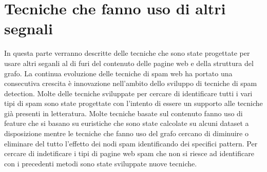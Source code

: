\section{Tecniche che fanno uso di altri segnali}
In questa parte verranno descritte delle tecniche che sono state progettate per usare altri seganli al di furi del contenuto delle pagine web e della struttura del grafo. La continua evoluzione delle tecniche di spam web ha portato una consecutiva crescita è innovazione nell'ambito dello sviluppo di tecniche di spam detection. Molte delle tecniche sviluppate per cercare di identificare tutti i vari tipi di spam sono state progettate con l'intento di essere un supporto alle tecniche già presenti in letteratura. Molte tecniche basate sul contenuto fanno uso di feature che si basano su euristiche che sono state calcolate su alcuni dataset a disposizione mentre le tecniche che fanno uso del grafo cercano di diminuire o eliminare del tutto l'effetto dei nodi spam identificando dei specifici pattern. Per cercare di indetificare i tipi di pagine web spam che non si riesce ad identificare con i precedenti metodi sono state sviluppate nuove tecniche.

